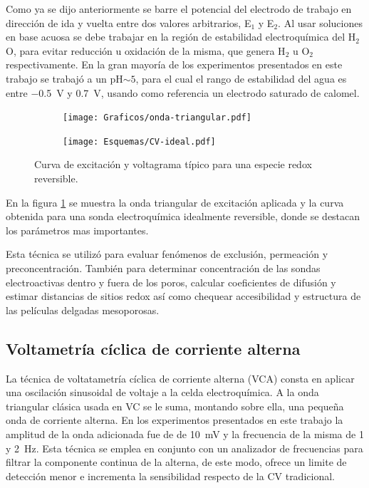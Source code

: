	 		Como ya se dijo anteriormente se barre el potencial del electrodo de trabajo en dirección de ida y vuelta entre dos valores arbitrarios, E$_1$ y E$_2$. Al usar soluciones en base acuosa se debe trabajar en la región de estabilidad electroquímica del H$_2$O, para evitar reducción u oxidación de la misma, que genera H$_2$ u O$_2$ respectivamente. En la gran mayoría de los experimentos presentados en este trabajo se trabajó a un pH$\sim 5$, para el cual el rango de estabilidad del agua es entre \SI{-0.5}{\volt} y \SI{0.7}{\volt}, usando como referencia un electrodo saturado de calomel.\cite{wang2014} 


	 			 \begin{figure}[h!]
			  		  \begin{subfigure}[t]{0.495\textwidth}
			  		  \texttt{[image: Graficos/onda-triangular.pdf]}
			  		  \end{subfigure}
			  		  \begin{subfigure}[t]{0.495\textwidth}
			  		  \texttt{[image: Esquemas/CV-ideal.pdf]}
			  		  \end{subfigure}
			  		  \caption[Voltamperometría ideal reversible]{Curva de excitación y voltagrama típico para una especie redox reversible.}
			  		  \label{fig:CV_ideal}
			  		  \end{figure}

	 		En la figura \ref{fig:CV_ideal} se muestra la onda triangular de excitación aplicada y la curva obtenida para una sonda electroquímica idealmente reversible, donde se destacan los parámetros mas importantes.
	 		
	 		Esta técnica se utilizó para evaluar fenómenos de exclusión, permeación y preconcentración. También para determinar concentración de las sondas electroactivas dentro y fuera de los poros, calcular coeficientes de difusión y estimar distancias de sitios redox así como chequear accesibilidad y estructura de las películas delgadas mesoporosas.


	 		

	 \subsection{Voltametría cíclica de corriente alterna}

	 		La técnica de voltatametría cíclica de corriente alterna (VCA) consta en aplicar una oscilación sinusoidal de voltaje a la celda electroquímica. A la onda triangular clásica usada en VC se le suma, montando sobre ella, una pequeña onda de corriente alterna. En los experimentos presentados en este trabajo la amplitud de la onda adicionada fue de de \SI{10}{\milli\volt} y la frecuencia de la misma de 1 y \SI{2}{\hertz}. Esta técnica se emplea en conjunto con un analizador de frecuencias para filtrar la componente continua de la alterna, de este modo, ofrece un limite de detección menor e incrementa la sensibilidad respecto de la CV tradicional.\cite{Wi2000,Skoog1995}

